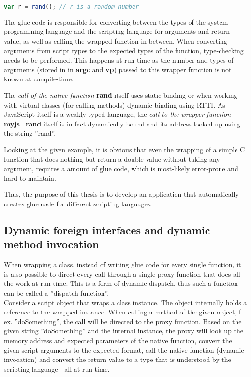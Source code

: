 \begin{lstlisting}[language=JavaScript, caption=Using a C function from SpiderMonkey]
var r = rand();	// r is a random number
\end{lstlisting}

The glue code is responsible for converting between the types of the system programming language and the scripting language for arguments and return value, as well as calling the wrapped function in between. When converting arguments from script types to the expected types of the function, type-checking needs to be performed. This happens at run-time as the number and types of arguments (stored in in \textbf{argc} and \textbf{vp}) passed to this wrapper function is not known at compile-time.

The \textit{call of the native function} \textbf{rand} itself uses static binding or when working with virtual classes (for calling methods) dynamic binding using RTTI. As JavaScript itself is a weakly typed language, the \textit{call to the wrapper function} \textbf{myjs\_rand} itself is in fact dynamically bound and its address looked up using the string ''rand''.

Looking at the given example, it is obvious that even the wrapping of a simple C function that does nothing but return a double value without taking any argument, requires a  amount of glue code, which is most-likely error-prone and hard to maintain.

Thus, the purpose of this thesis is to develop an application that automatically creates glue code for different scripting languages.

\subsection{Dynamic foreign interfaces and dynamic method invocation}

When wrapping a class, instead of writing glue code for every single function, it is also possible to direct every call through a single proxy function that does all the work at run-time. This is a form of dynamic dispatch, thus such a function can be called a ''dispatch function''. \\

Consider a script object that wraps a class instance. The object internally holds a reference to the wrapped instance. When calling a method of the given object, f. ex. ''doSomething'', the call will be directed to the proxy function. Based on the given string ''doSomething'' and the internal instance, the proxy will look up the memory address and expected parameters of the native function, convert the given script-arguments to the expected format, call the native function (dynamic invocation) and convert the return value to a type that is understood by the scripting language - all at run-time.

